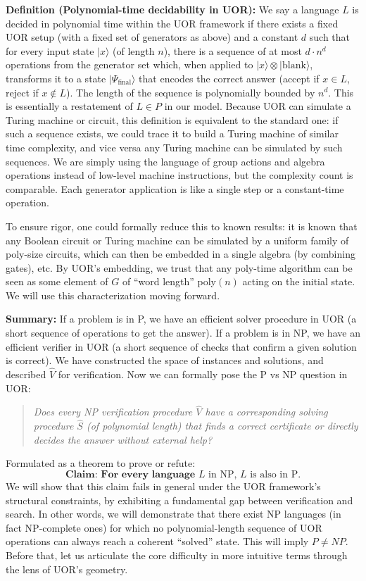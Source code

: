 \documentclass[11pt]{article}
\begin{document}
\textbf{Definition (Polynomial-time decidability in UOR):} We say a language \(L\) is decided in polynomial time within the UOR framework if there exists a fixed UOR setup (with a fixed set of generators as above) and a constant \(d\) such that for every input state \(|x\rangle\) (of length \(n\)), there is a sequence of at most \(d \cdot n^d\) operations from the generator set which, when applied to \(|x\rangle \otimes |\mathrm{blank}\rangle\), transforms it to a state \(|\Psi_{\text{final}}\rangle\) that encodes the correct answer (accept if \(x \in L\), reject if \(x \notin L\)). The length of the sequence is polynomially bounded by \(n^d\). This is essentially a restatement of \(L \in P\) in our model. Because UOR can simulate a Turing machine or circuit, this definition is equivalent to the standard one: if such a sequence exists, we could trace it to build a Turing machine of similar time complexity, and vice versa any Turing machine can be simulated by such sequences. We are simply using the language of group actions and algebra operations instead of low-level machine instructions, but the complexity count is comparable. Each generator application is like a single step or a constant-time operation.

To ensure rigor, one could formally reduce this to known results: it is known that any Boolean circuit or Turing machine can be simulated by a uniform family of poly-size circuits, which can then be embedded in a single algebra (by combining gates), etc. By UOR’s embedding, we trust that any poly-time algorithm can be seen as some element of \(G\) of “word length” poly\((n)\) acting on the initial state. We will use this characterization moving forward.

\bigskip

\textbf{Summary:} If a problem is in P, we have an efficient solver procedure in UOR (a short sequence of operations to get the answer). If a problem is in NP, we have an efficient verifier in UOR (a short sequence of checks that confirm a given solution is correct). We have constructed the space of instances and solutions, and described \(\hat{V}\) for verification. Now we can formally pose the P vs NP question in UOR:
\begin{quote}
    \emph{Does every NP verification procedure \(\hat{V}\) have a corresponding solving procedure \(\hat{S}\) (of polynomial length) that finds a correct certificate or directly decides the answer without external help?}
\end{quote}
Formulated as a theorem to prove or refute:
\[
\textbf{Claim: For every language } L \text{ in NP, } L \text{ is also in P.}
\]
We will show that this claim fails in general under the UOR framework’s structural constraints, by exhibiting a fundamental gap between verification and search. In other words, we will demonstrate that there exist NP languages (in fact NP-complete ones) for which no polynomial-length sequence of UOR operations can always reach a coherent “solved” state. This will imply \(P \neq NP\). Before that, let us articulate the core difficulty in more intuitive terms through the lens of UOR’s geometry.
\end{document}
